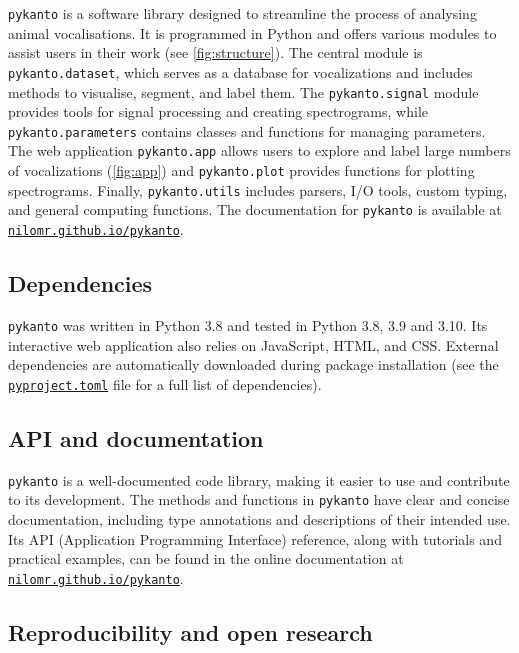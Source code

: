 \texttt{pykanto} is a software library designed to streamline the process of
analysing animal vocalisations. It is programmed in Python and offers various
modules to assist users in their work (see \autoref{fig:structure}). The central module is
\texttt{pykanto.dataset}, which serves as a database for vocalizations and
includes methods to visualise, segment, and label them. The \texttt{pykanto.signal} module provides tools for
signal processing and creating spectrograms, while \texttt{pykanto.parameters}
contains classes and functions for managing parameters. The web application
\texttt{pykanto.app} allows users to explore and label large numbers of
vocalizations (\autoref{fig:app}) and \texttt{pykanto.plot} provides functions for
plotting spectrograms. Finally, \texttt{pykanto.utils} includes parsers, I/O
tools, custom typing, and general computing functions. The documentation for
\texttt{pykanto} is available at
\href{https://nilomr.github.io/pykanto}{\nolinkurl{nilomr.github.io/pykanto}}.

\subsection{Dependencies}

\texttt{pykanto} was written in Python 3.8 and tested in Python 3.8, 3.9 and
3.10. Its interactive web application also relies on JavaScript, HTML, and CSS.
External dependencies are automatically downloaded during package installation
(see the
\href{https://github.com/nilomr/pykanto/blob/main/pyproject.toml}{\texttt{pyproject.toml}}
file for a full list of dependencies).

\subsection{API and documentation}

\texttt{pykanto} is a well-documented code library, making it easier to use and
contribute to its development. The methods and functions in \texttt{pykanto} have clear
and concise documentation, including type annotations and descriptions of their
intended use. Its API (Application Programming Interface) reference, along with
tutorials and practical examples, can be found in the online documentation
at \href{https://nilomr.github.io/pykanto}{\nolinkurl{nilomr.github.io/pykanto}}.

\subsection{Reproducibility and open research}

